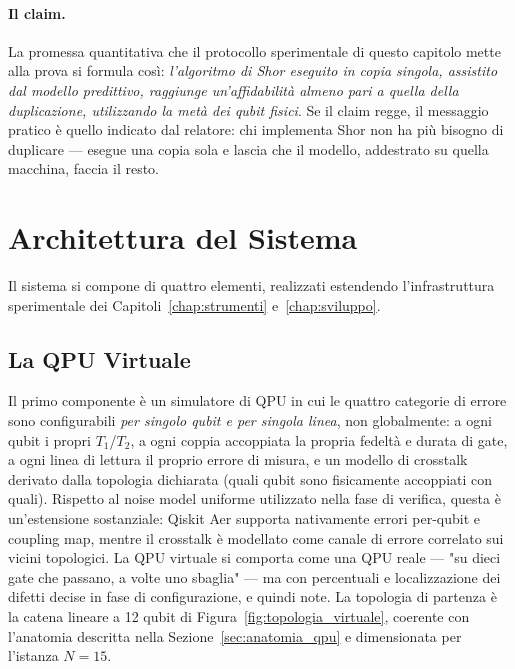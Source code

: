 \begin{onehalfspace}
\paragraph{Il claim.}
La promessa quantitativa che il protocollo sperimentale di questo capitolo mette alla prova si formula così: \emph{l'algoritmo di Shor eseguito in copia singola, assistito dal modello predittivo, raggiunge un'affidabilità almeno pari a quella della duplicazione, utilizzando la metà dei qubit fisici}. Se il claim regge, il messaggio pratico è quello indicato dal relatore: chi implementa Shor non ha più bisogno di duplicare --- esegue una copia sola e lascia che il modello, addestrato su quella macchina, faccia il resto.

\section{Architettura del Sistema}
\label{sec:architettura_predittiva}

Il sistema si compone di quattro elementi, realizzati estendendo l'infrastruttura sperimentale dei Capitoli~\ref{chap:strumenti} e~\ref{chap:sviluppo}.

\subsection{La QPU Virtuale}
\label{subsec:qpu_virtuale}

Il primo componente è un simulatore di \ac{QPU} in cui le quattro categorie di errore sono configurabili \emph{per singolo qubit e per singola linea}, non globalmente: a ogni qubit i propri $T_1$/$T_2$, a ogni coppia accoppiata la propria fedeltà e durata di gate, a ogni linea di lettura il proprio errore di misura, e un modello di crosstalk derivato dalla topologia dichiarata (quali qubit sono fisicamente accoppiati con quali). Rispetto al noise model uniforme utilizzato nella fase di verifica, questa è un'estensione sostanziale: Qiskit Aer supporta nativamente errori per-qubit e coupling map, mentre il crosstalk è modellato come canale di errore correlato sui vicini topologici. La QPU virtuale si comporta come una QPU reale --- "su dieci gate che passano, a volte uno sbaglia" --- ma con percentuali e localizzazione dei difetti decise in fase di configurazione, e quindi note. La topologia di partenza è la catena lineare a 12 qubit di Figura~\ref{fig:topologia_virtuale}, coerente con l'anatomia descritta nella Sezione~\ref{sec:anatomia_qpu} e dimensionata per l'istanza $N=15$.


\end{onehalfspace}
